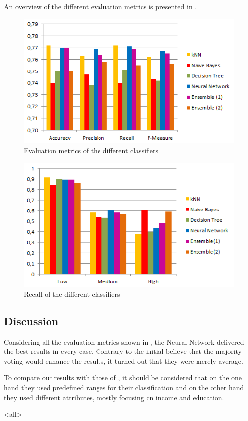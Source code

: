An overview of the different evaluation metrics is presented in .
\begin{figure}[H]
	\centering
	\includegraphics[width=\columnwidth]{../../charts/results.png}
	\caption{Evaluation metrics of the different classifiers}
	\label{fig:result}
\end{figure}

\begin{figure}[H]
	\centering
	\includegraphics[width=\columnwidth]{../../charts/recall.png}
	\caption{Recall of the different classifiers}
	\label{fig:recall}
\end{figure}

\subsection{Discussion}

Considering all the evaluation metrics shown in , the Neural Network delivered the best results in every case. Contrary to the initial believe that the majority voting would enhance the results, it turned out that they were merely average. 

To compare our results with those of \cite{indian}, it should be considered that on the one hand they used predefined ranges for their classification and on the other hand they used different attributes, mostly focusing on income and education.


\mode<all>